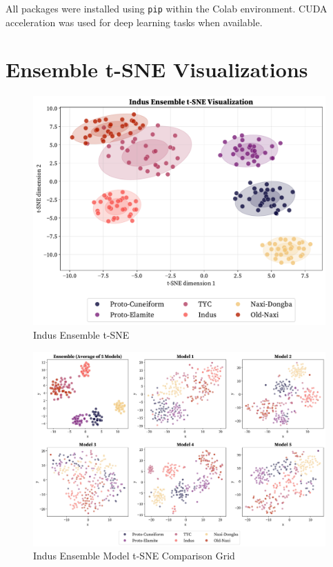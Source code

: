 \documentclass[11pt,a4paper,oneside]{report}
\begin{document}
\vspace{0.5cm}
All packages were installed using \texttt{pip} within the Colab environment. CUDA acceleration was used for deep learning tasks when available.

\clearpage
\section{Ensemble t-SNE Visualizations}
\label{app: t-sne}


\begin{figure}[H] 
    \centering
    \includegraphics[width=0.8\linewidth]{Visualizations/t-SNE/Indus/ensemble_tsne.pdf}
     \caption*{Indus Ensemble t-SNE}
\end{figure}

\begin{figure}[H] 
    \centering
    \includegraphics[width=1\linewidth]{Visualizations/t-SNE/Indus/model_comparison_grid.pdf}
     \caption*{Indus Ensemble Model t-SNE Comparison Grid}
\end{figure}
\end{document}
